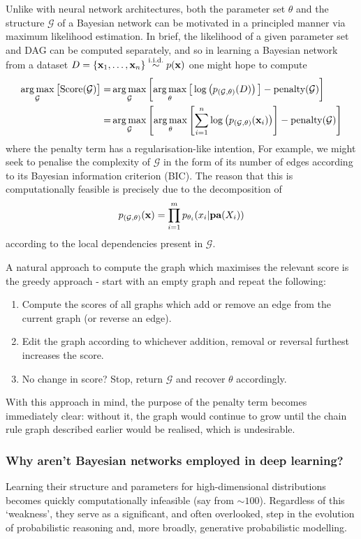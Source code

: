 \documentclass[11pt]{article}
\begin{document}
Unlike with neural network architectures, both the parameter set $\theta$ and the structure $\mathcal{G}$ of a Bayesian network can be motivated in a principled manner via maximum likelihood estimation. In brief, the likelihood of a given parameter set and DAG can be computed separately, and so in learning a Bayesian network from a dataset $D=\{\mathbf{x}_1,\dots,\mathbf{x}_n\}\overset{\text{i.i.d.}}{\sim}p(\mathbf{x})$ one might hope to compute
\begin{align*}
    \operatorname*{arg\,max}_{\mathcal{G}}\big[\text{Score}(\mathcal{G})\big]
    =&\operatorname*{arg\,max}_{\mathcal{G}}\left[\operatorname*{arg\,max}_{\theta}\big[\log\left(p_{(\mathcal{G}, \theta)}(D)\right)\big]-\text{penalty}(\mathcal{G})\right]\\
    =&\operatorname*{arg\,max}_{\mathcal{G}}\left[\operatorname*{arg\,max}_{\theta}\left[\sum_{i=1}^n\log\left(p_{(\mathcal{G}, \theta)}(\mathbf{x}_i)\right)\right]-\text{penalty}(\mathcal{G})\right]
\end{align*}
where the penalty term has a regularisation-like intention, For example, we might seek to penalise the complexity of $\mathcal{G}$ in the form of its number of edges according to its Bayesian information criterion (BIC). The reason that this is computationally feasible is precisely due to the decomposition of
$$
p_{(\mathcal{G},\theta)}(\mathbf{x})
=
\prod_{i=1}^m p_{\theta_i}(x_i|\textbf{pa}(X_i))
$$
according to the local dependencies present in $\mathcal{G}$.

A natural approach to compute the graph which maximises the relevant score is the greedy approach - start with an empty graph and repeat the following:
\begin{enumerate}
    \item Compute the scores of all graphs which add or remove an edge from the current graph (or reverse an edge).
    \item Edit the graph according to whichever addition, removal or reversal furthest increases the score.
    \item No change in score? Stop, return $\mathcal{G}$ and recover $\theta$ accordingly.
\end{enumerate}
With this approach in mind, the purpose of the penalty term becomes immediately clear: without it, the graph would continue to grow until the chain rule graph described earlier would be realised, which is undesirable.

\subsubsection{Why aren't Bayesian networks employed in deep learning?}
Learning their structure and parameters for high-dimensional distributions becomes quickly computationally infeasible (say from $\sim100$). Regardless of this `weakness', they serve as a significant, and often overlooked, step in the evolution of probabilistic reasoning and, more broadly, generative probabilistic modelling.
\end{document}
